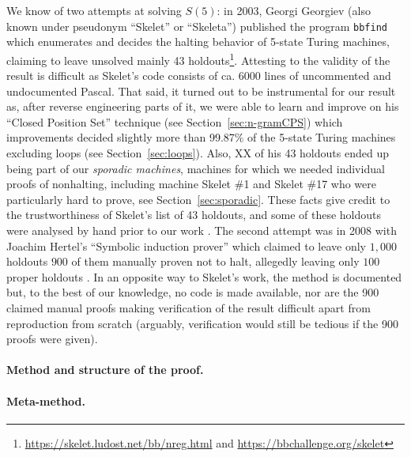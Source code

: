 \documentclass[a4paper,british]{article}
\theoremstyle{definition} %
\numberwithin{equation}{section}
\theoremstyle{definition} %
\newcommand{\ts}[1]{{\color{red}#1}}
\begin{document}
\newcommand{\SkeletHoldoutsSporadic}{\ts{XX}\xspace}

We know of two attempts at solving $S(5)$: in 2003, Georgi Georgiev (also known under pseudonym ``Skelet'' or ``Skeleta'') published the program \texttt{bbfind} \cite{Skelet_bbfind} which enumerates and decides the halting behavior of 5-state Turing machines, claiming to leave unsolved mainly 43 holdouts\footnote{\url{https://skelet.ludost.net/bb/nreg.html} and \url{https://bbchallenge.org/skelet}}. Attesting to the validity of the result is difficult as Skelet's code consists of ca. 6000 lines of uncommented and undocumented Pascal. That said, it turned out to be instrumental for our result as, after reverse engineering parts of it, we were able to learn and improve on his ``Closed Position Set'' technique (see Section~\ref{sec:n-gramCPS}) which improvements decided slightly more than 99.87\% of the 5-state Turing machines excluding loops (see Section~\ref{sec:loops}). Also, \SkeletHoldoutsSporadic of his 43 holdouts ended up being part of our \textit{sporadic machines}, \ie machines for which we needed individual proofs of nonhalting, including machine Skelet \#1 and Skelet \#17 who were particularly hard to prove, see Section~\ref{sec:sporadic}. These facts give credit to the trustworthiness of Skelet's list of 43 holdouts, and some of these holdouts were analysed by hand prior to our work \cite{DanBriggs}. The second attempt was in 2008 with Joachim Hertel's ``Symbolic induction prover'' which claimed to leave only $1{,}000$ holdouts $900$ of them manually proven not to halt, allegedly leaving only $100$ proper holdouts \cite{Hertel}. In an opposite way to Skelet's work, the method is documented but, to the best of our knowledge, no code is made available, nor are the 900 claimed manual proofs making verification of the result difficult apart from reproduction from scratch (arguably, verification would still be tedious if the 900 proofs were given).



\paragraph{Method and structure of the proof.}

\paragraph{Meta-method.}
\end{document}
